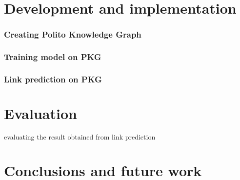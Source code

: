 \documentclass[%
    corpo=13.5pt,
    twoside,
    oldstyle,
    tipotesi=magistrale,
    greek,
    evenboxes
]{toptesi}
\begin{document}
\chapter{Development and implementation}

\subsection{Creating Polito Knowledge Graph}

\subsection{Training model on PKG}

\subsection{Link prediction on PKG}

\chapter{Evaluation}

evaluating the result obtained from link prediction

\chapter{Conclusions and future work}





\end{document}
